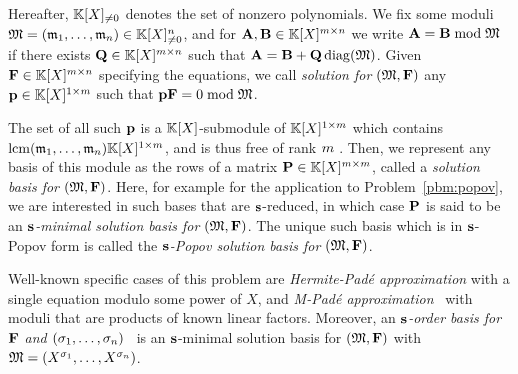 \documentclass[preprint]{sig-alternate-05-2015}
\begin{document}
Hereafter, $\mathbb{K}[X]_{\neq 0}$ denotes the set of nonzero polynomials. We fix some
moduli $\mathfrak{M} = (\mathfrak{m}_1,\ldots,\mathfrak{m}_n) \in \mathbb{K}[X]_{\neq 0}^n$, and
for $\mat{A}, \mat{B} \in \polMatSpace[\nbun][\nbeq]$ we write $\mat{A} =
\mat{B} \bmod \Modulus$ if there exists $\mat{Q} \in
\polMatSpace[\rdim][\cdim]$ such that $\mat{A} = \mat{B} + \mat{Q}
\diag{\Modulus}$. Given $\sys \in \sysSpace$ specifying the equations, we call
\emph{solution for $(\Modulus,\sys)$} any $\sol \in \solSpace$ such that $\sol
\sys = 0 \bmod \Modulus$.

The set of all such $\row{p}$ is a $\mathbb{K}[X]$-submodule of $\solSpace$ which
contains $\mathrm{lcm}(\modulus_1,\ldots,\modulus_\nbeq) \solSpace$, and is
thus free of rank $m$ \cite[p.~146]{Lang02}. Then, we represent any basis
of this module as the rows of a matrix $\msb \in \msbSpace$, called a
\emph{solution basis for $(\Modulus,\sys)$}.
Here, for example for the application to Problem~\ref{pbm:popov}, we are
interested in such bases that are $\mathbf{s}$-reduced, in which case $\msb$ is
said to be an \emph{$\mathbf{s}$-minimal solution basis for $(\Modulus,\sys)$}.
The unique such basis which is in $\mathbf{s}$-Popov form is called the
\emph{$\mathbf{s}$-Popov solution basis for $(\Modulus,\sys)$}.

\begin{figure}[h]
  \centering
{}
\end{figure}

Well-known specific cases of this problem are \emph{Hermite-Pad\'e
approximation} with a single equation modulo some power of $X$, and
\emph{M-Pad\'e approximation}~\cite{Beckermann92,BarBul92} with moduli that are
products of known linear factors. Moreover, an \emph{$\mathbf{s}$-order basis for
$\sys$ and $(\sigma_1,\ldots,\sigma_n)$}~\cite{ZhoLab12} is an
$\mathbf{s}$-minimal solution basis for $(\Modulus,\sys)$ with $\mathfrak{M} =
(X^{\sigma_1},\ldots,X^{\sigma_n})$.
\end{document}
